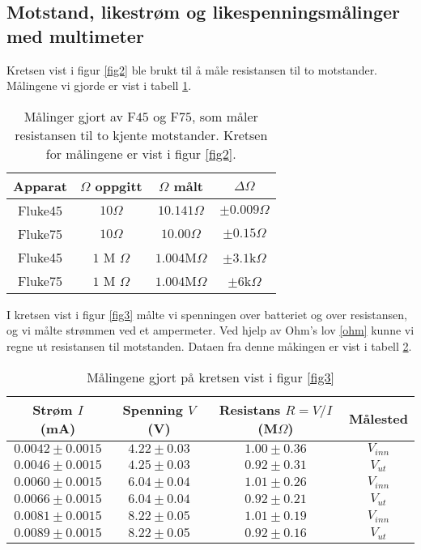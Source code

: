 \documentclass[%
 reprint,
 amsmath,amssymb,
 aps,
]{revtex4-1}
\begin{document}
\subsection{Motstand, likestrøm og likespenningsmålinger
med multimeter}
Kretsen vist i figur \ref{fig2} ble brukt til å måle resistansen til to motstander. Målingene vi gjorde er vist i tabell \ref{table2}. \\
\begin{table}[h!]
\centering
\caption{Målinger gjort av F$45$ og F$75$, som måler resistansen til to kjente motstander. Kretsen for målingene er vist i figur \ref{fig2}.}
\label{table2}
\begin{tabular}{c c c c}
\toprule
Apparat & $\Omega$ oppgitt & $\Omega$ målt    & $\Delta \Omega$    \\
\hline
Fluke45 & $10\Omega$       & $10.141 \Omega$  & $\pm 0.009\Omega$ \\
Fluke75 & $10\Omega$       & $10.00\Omega$     & $\pm 0.15\Omega$    \\
Fluke45 & $1$ M $\Omega$   & $1.004$M$\Omega$ & $\pm 3.1$k$\Omega$ \\
Fluke75 & $1$ M $\Omega$   & $1.004$M$\Omega$ & $\pm 6$k$\Omega$   \\
\end{tabular}
\end{table}
I kretsen vist i figur \ref{fig3} målte vi spenningen over batteriet og over resistansen, og vi målte strømmen ved et ampermeter. Ved hjelp av Ohm's lov \eqref{ohm} kunne vi regne ut resistansen til motstanden. Dataen fra denne måkingen er vist i tabell \ref{table3}.
\begin{table}[h!]
\centering
\caption{Målingene gjort på kretsen vist i figur \ref{fig3}}
\label{table3}
\begin{tabular}{c c c c }
\toprule
    Strøm $I$ (mA) & Spenning $V$ (V) & Resistans $R = V/I$ (M$\Omega$) & Målested \\
\hline
 $ 0.0042 \pm 0.0015$  &   $4.22 \pm 0.03$ &                $  1.00 \pm 0.36 $ &      $V_{inn}$ \\
 $0.0046 \pm 0.0015$ &   $ 4.25 \pm 0.03$ &             $    0.92 \pm 0.31 $&     $ V_{ut} $\\
 $0.0060 \pm 0.0015$ &   $ 6.04 \pm 0.04$ &                 $ 1.01 \pm 0.26 $&     $ V_{inn}$ \\
 $0.0066 \pm 0.0015 $ &   $ 6.04 \pm 0.04$ &               $   0.92 \pm 0.21 $ &     $ V_{ut}$ \\
 $0.0081 \pm 0.0015$ &   $ 8.22 \pm 0.05$ &                 $ 1.01 \pm 0.19 $&     $ V_{inn}$ \\
$ 0.0089 \pm 0.0015$ &    $8.22 \pm 0.05$ &                  $0.92 \pm 0.16$ &      $V_{ut}$ \\
\end{tabular}
\end{table}
\end{document}
